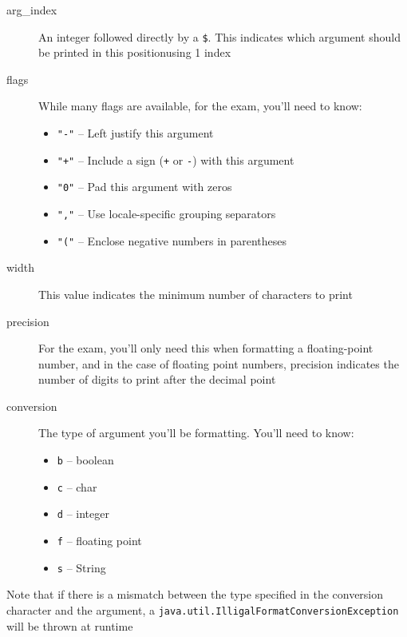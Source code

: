 \begin{description}
    \item[arg\_index] An integer followed directly by a \verb#$#. This 
    indicates which argument should be printed in this positionusing 1 index
    \item[flags] While many flags are available, for the exam, you'll need to 
    know:
        \begin{itemize}
            \item \verb#"-"# -- Left justify this argument
            \item \verb#"+"# -- Include a sign (\verb#+# or \verb#-#) with this 
            argument
            \item \verb#"0"# -- Pad this argument with zeros
            \item \verb#","# -- Use locale-specific grouping separators
            \item \verb#"("# -- Enclose negative numbers in parentheses
        \end{itemize}
    \item[width] This value indicates the minimum number of characters to print
    \item[precision] For the exam, you'll only need this when formatting a 
    floating-point number, and in the case of floating point numbers, precision 
    indicates the number of digits to print after the decimal point
    \item[conversion] The type of argument you'll be formatting. You'll need to 
    know:
        \begin{itemize}
            \item \verb#b# -- boolean
            \item \verb#c# -- char
            \item \verb#d# -- integer
            \item \verb#f# -- floating point
            \item \verb#s# -- String
        \end{itemize}
\end{description}
Note that if there is a mismatch between the type specified in the conversion 
character and the argument, a \verb#java.util.IlligalFormatConversionException# 
will be thrown at runtime
